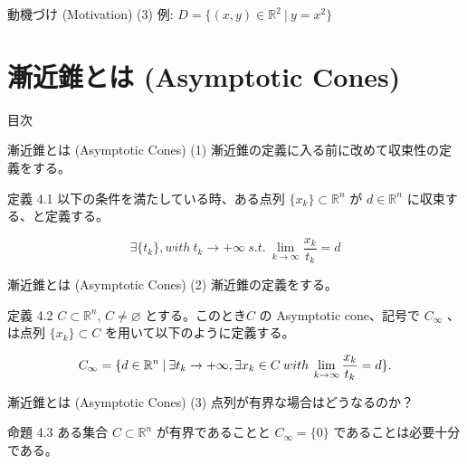 \documentclass[aspectratio=169, dvipdfmx, 11pt]{beamer} %
\begin{document}
\begin{frame}{動機づけ (Motivation) (3) }
  例: $D = \{(x,y) \in \mathbb{R}^2 \:|\: y=x^2\}$

\end{frame}


\section{漸近錐とは (Asymptotic Cones) }
\begin{frame}{目次}
    \tableofcontents[currentsection]
\end{frame}

\begin{frame}{漸近錐とは (Asymptotic Cones) (1) }
  漸近錐の定義に入る前に改めて収束性の定義をする。
  \begin{block}{定義 4.1}
    以下の条件を満たしている時、ある点列 $\{ x_k \} \subset \mathbb{R} ^n$ が $d \in \mathbb{R} ^n$ に収束する、と定義する。

    \begin{equation}
      \exists\{ t_k \}, with\: t_k \rightarrow +\infty \:s.t.\: \lim_{k \to \infty} \frac{x_k}{t_k} = d \tag*{(2.1)}
    \end{equation}
  \end{block}
\end{frame}

\begin{frame}{漸近錐とは (Asymptotic Cones) (2) }
  漸近錐の定義をする。
  \begin{block}{定義 4.2}
    $C \subset \mathbb{R}^n$, $C \neq \varnothing$ とする。このとき$C$ の Asymptotic cone、記号で $C_\infty$ 、は点列 $\{ x_k \} \subset C$ を用いて以下のように定義する。

    \begin{equation}
      C_\infty = \{ d \in
    \mathbb{R}^n \:|\: \exists t_k \rightarrow +\infty, \exists x_k \in C \:with\: \lim_{k \to \infty} \frac{x_k}{t_k} = d \}. \notag
    \end{equation}
  \end{block}
\end{frame}

\begin{frame}{漸近錐とは (Asymptotic Cones) (3) }
  点列が有界な場合はどうなるのか？
  \begin{block}{命題 4.3}
    ある集合 $C \subset \mathbb{R}^n$ が有界であることと $C_\infty = \{0\}$ であることは必要十分である。
  \end{block}
\end{frame}
\end{document}
